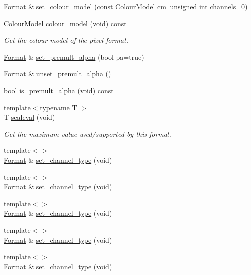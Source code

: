 \begin{DoxyCompactItemize}
\hyperlink{class_c_m_s_1_1_format}{Format} \& \hyperlink{class_c_m_s_1_1_format_a741f035f99ca8787ab47a1d4446de083}{set\+\_\+colour\+\_\+model} (const \hyperlink{namespace_c_m_s_a9cb18b5da51a22c3c9dd25a5c9048e42}{Colour\+Model} cm, unsigned int \hyperlink{class_c_m_s_1_1_format_a3c58f7bf8ac3d880c0610672e2c2c4de}{channels}=0)
\item 
\hyperlink{namespace_c_m_s_a9cb18b5da51a22c3c9dd25a5c9048e42}{Colour\+Model} \hyperlink{class_c_m_s_1_1_format_a74fddbb27e7cf4046af0326f6a886f83}{colour\+\_\+model} (void) const
\begin{DoxyCompactList}\small\item\em Get the colour model of the pixel format. \end{DoxyCompactList}\item 
\hyperlink{class_c_m_s_1_1_format}{Format} \& \hyperlink{class_c_m_s_1_1_format_a59efd2fff84010ad80602892a4e71a67}{set\+\_\+premult\+\_\+alpha} (bool pa=true)
\item 
\hyperlink{class_c_m_s_1_1_format}{Format} \& \hyperlink{class_c_m_s_1_1_format_a2075b55ec46e6f7cfa2900e5b137e2e8}{unset\+\_\+premult\+\_\+alpha} ()
\item 
bool \hyperlink{class_c_m_s_1_1_format_a61dddc7b2e1ef8a45153db56c9178455}{is\+\_\+premult\+\_\+alpha} (void) const
\item 
{\footnotesize template$<$typename T $>$ }\\T \hyperlink{class_c_m_s_1_1_format_a289beec4f2ae6b88c198c4d96364d6c3}{scaleval} (void)
\begin{DoxyCompactList}\small\item\em Get the maximum value used/supported by this format. \end{DoxyCompactList}\item 
{\footnotesize template$<$$>$ }\\\hyperlink{class_c_m_s_1_1_format}{Format} \& \hyperlink{class_c_m_s_1_1_format_a04bd5a40c45aca469875c3eb1f72eff8}{set\+\_\+channel\+\_\+type} (void)
\item 
{\footnotesize template$<$$>$ }\\\hyperlink{class_c_m_s_1_1_format}{Format} \& \hyperlink{class_c_m_s_1_1_format_a04bd5a40c45aca469875c3eb1f72eff8}{set\+\_\+channel\+\_\+type} (void)
\item 
{\footnotesize template$<$$>$ }\\\hyperlink{class_c_m_s_1_1_format}{Format} \& \hyperlink{class_c_m_s_1_1_format_a04bd5a40c45aca469875c3eb1f72eff8}{set\+\_\+channel\+\_\+type} (void)
\item 
{\footnotesize template$<$$>$ }\\\hyperlink{class_c_m_s_1_1_format}{Format} \& \hyperlink{class_c_m_s_1_1_format_a04bd5a40c45aca469875c3eb1f72eff8}{set\+\_\+channel\+\_\+type} (void)
\item 
{\footnotesize template$<$$>$ }\\\hyperlink{class_c_m_s_1_1_format}{Format} \& \hyperlink{class_c_m_s_1_1_format_a04bd5a40c45aca469875c3eb1f72eff8}{set\+\_\+channel\+\_\+type} (void)
\end{DoxyCompactItemize}
